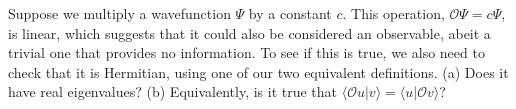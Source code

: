 Suppose we multiply a wavefunction $\Psi$ by a constant $c$.
This operation, $\mathcal{O}\Psi=c\Psi$, is linear,
which suggests that it could also be
considered an observable, abeit a trivial one that provides no 
information. To see if this is true, we also need to check that
it is Hermitian, using one of our two equivalent definitions.
(a) Does it have real eigenvalues? (b) Equivalently, is it true that
$\langle \mathcal{O} u|v\rangle = \langle  u|\mathcal{O} v\rangle$?
